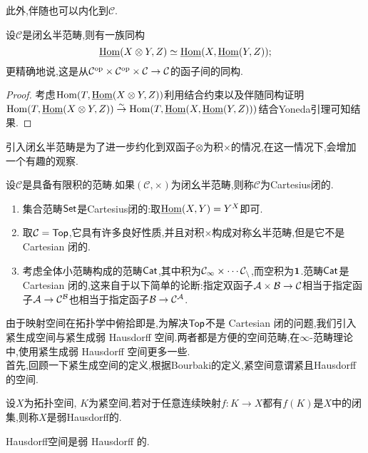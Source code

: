 此外,伴随也可以内化到$\mathcal{C}$.
\begin{proposition}
    设$\mathcal{C}$是闭幺半范畴,则有一族同构
    \[
    \underline{\operatorname{Hom}}(X\otimes Y,Z)\simeq \underline{\operatorname{Hom}}(X,\underline{\operatorname{Hom}}(Y,Z));
    \]
    更精确地说,这是从$\mathcal{C}^{\operatorname{op}}\times \mathcal{C}^{\operatorname{op}}\times \mathcal{C} \to \mathcal{C}$的函子间的同构.
\end{proposition}
\begin{proof}
    考虑$\operatorname{Hom}(T,\underline{\operatorname{Hom}}(X\otimes Y,Z))$利用结合约束以及伴随同构证明$\operatorname{Hom}(T,\underline{\operatorname{Hom}}(X\otimes Y,Z))\stackrel{\sim}{\rightarrow} \operatorname{Hom}(T,\underline{\operatorname{Hom}}(X,\underline{\operatorname{Hom}}(Y,Z)))$结合Yoneda引理可知结果.
\end{proof}
引入闭幺半范畴是为了进一步约化到双函子$\otimes$为积$\times$的情况,在这一情况下,会增加一个有趣的观察.
\begin{definition}[Cartesius闭]
    设$\mathcal{C}$是具备有限积的范畴.如果$(\mathcal{C},\times)$为闭幺半范畴,则称$\mathcal{C}$为Cartesius闭的.
\end{definition}
\begin{example}
\begin{enumerate}
    \item 集合范畴$\mathsf{Set}$是Cartesius闭的:取$\underline{\operatorname{Hom}}(X,Y) = Y^X$即可.
    \item 取$\mathcal{C} = \mathsf{Top}$,它具有许多良好性质,并且对积$\times$构成对称幺半范畴,但是它不是 Cartesian 闭的.
    \item 考虑全体小范畴构成的范畴$\mathsf{Cat}$,其中积为$\cal{C}_1\times \cdots \cal{C}_n$,而空积为$\bold{1}$.范畴$\mathsf{Cat}$是 Cartesian 闭的,这来自于以下简单的论断:指定双函子$\cal{A} \times \cal{B} \to \cal{C}$相当于指定函子$\cal{A} \to \cal{C}^{\cal{B}}$也相当于指定函子$\cal{B} \to \cal{C}^{\cal{A}}$.
\end{enumerate}
\end{example}
由于映射空间在拓扑学中俯拾即是,为解决$\mathsf{Top}$不是 Cartesian 闭的问题,我们引入紧生成空间与紧生成弱 Hausdorff 空间.两者都是方便的空间范畴,在$\infty$-范畴理论中,使用紧生成弱 Hausdorff 空间更多一些.\\
首先,回顾一下紧生成空间的定义,根据Bourbaki的定义,紧空间意谓紧且Hausdorff的空间.
\begin{definition}[弱Hausdorff]\label{定义:弱Hausdorff}
    设$X$为拓扑空间, $K$为紧空间,若对于任意连续映射$f: K \to X$都有$f(K)$是$X$中的闭集,则称$X$是弱Hausdorff的.
\end{definition}
\begin{example}
    Hausdorff空间是弱 Hausdorff 的.
\end{example}
